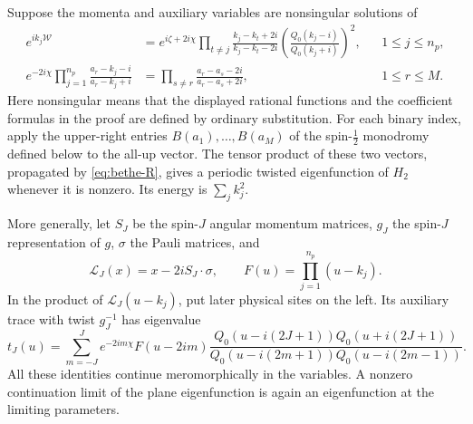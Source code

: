 \begin{lemma}\label{lem:bethe-algebra}
Suppose the momenta and auxiliary variables are nonsingular solutions of
\begin{equation}\label{eq:B8}
 \begin{aligned}
 e^{ik_j\mathcal W}
   &=e^{i\zeta+2i\chi}
       \prod_{t\ne j}\frac{k_j-k_t+2i}{k_j-k_t-2i}
       \left(\frac{Q_0(k_j-i)}{Q_0(k_j+i)}\right)^2,
       &&1\leq j\leq n_p,\\
 e^{-2i\chi}\prod_{j=1}^{n_p}
       \frac{a_r-k_j-i}{a_r-k_j+i}
   &=\prod_{s\ne r}\frac{a_r-a_s-2i}{a_r-a_s+2i},
       &&1\leq r\leq M.
 \end{aligned}
\end{equation}
Here nonsingular means that the displayed rational functions and the
coefficient formulas in the proof are defined by ordinary substitution.
For each binary index, apply the upper-right entries $B(a_1),\ldots,B(a_M)$
of the spin-$\frac12$ monodromy defined below to the all-up vector.  The
tensor product of these two vectors, propagated by \eqref{eq:bethe-R},
gives a periodic twisted eigenfunction of $H_2$ whenever it is nonzero.
Its energy is $\sum_j k_j^2$.

More generally, let $S_J$ be the spin-$J$ angular momentum matrices,
$g_J$ the spin-$J$ representation of $g$, $\sigma$ the Pauli matrices, and
\[
 \mathcal L_J(x)=x-2iS_J\cdot\sigma,
 \qquad F(u)=\prod_{j=1}^{n_p}(u-k_j).
\]
In the product of $\mathcal L_J(u-k_j)$, put later physical sites on the
left.  Its auxiliary trace with twist $g_J^{-1}$ has eigenvalue
\begin{equation}\label{eq:B9}
 t_J(u)=\sum_{m=-J}^{J}e^{-2im\chi}F(u-2im)
 \frac{Q_0(u-i(2J+1))Q_0(u+i(2J+1))}
      {Q_0(u-i(2m+1))Q_0(u-i(2m-1))}.
\end{equation}
All these identities continue meromorphically in the variables.  A
nonzero continuation limit of the plane eigenfunction is again an
eigenfunction at the limiting parameters.
\end{lemma}

